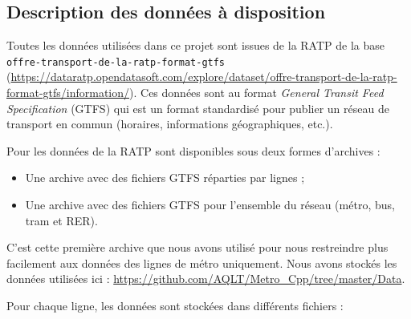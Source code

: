 \documentclass[,french]{article}
\providecommand{\tightlist}{%
  \setlength{\itemsep}{0pt}\setlength{\parskip}{0pt}}
\begin{document}
\hypertarget{description-des-donnuxe9es-uxe0-disposition}{%
\subsection{Description des données à
disposition}\label{description-des-donnuxe9es-uxe0-disposition}}

Toutes les données utilisées dans ce projet sont issues de la RATP de la
base \texttt{offre-transport-de-la-ratp-format-gtfs}
(\url{https://dataratp.opendatasoft.com/explore/dataset/offre-transport-de-la-ratp-format-gtfs/information/}).
Ces données sont au format \emph{General Transit Feed Specification}
(GTFS) qui est un format standardisé pour publier un réseau de transport
en commun (horaires, informations géographiques, etc.).

Pour les données de la RATP sont disponibles sous deux formes d'archives
:

\begin{itemize}
\tightlist
\item
  Une archive avec des fichiers GTFS réparties par lignes ;\\
\item
  Une archive avec des fichiers GTFS pour l'ensemble du réseau (métro,
  bus, tram et RER).
\end{itemize}

C'est cette première archive que nous avons utilisé pour nous
restreindre plus facilement aux données des lignes de métro uniquement.
Nous avons stockés les données utilisées ici :
\url{https://github.com/AQLT/Metro_Cpp/tree/master/Data}.

Pour chaque ligne, les données sont stockées dans différents fichiers :
\end{document}
